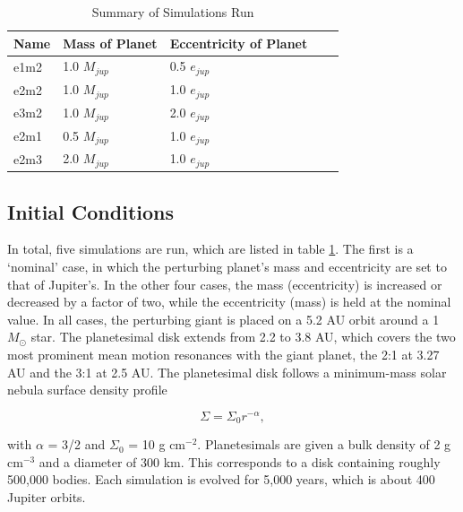 \documentclass[twocolumn]{aastex63}
\begin{document}
\begin{table}
\begin{center}
\caption{Summary of Simulations Run}
\begin{tabular}{lllll} \hline \hline
Name     & Mass of Planet & Eccentricity of Planet &  &  \\ \hline
e1m2 & 1.0 $M_{jup}$                     & 0.5 $e_{jup}$                            &  &  \\
e2m2      & 1.0 $M_{jup}$                     & 1.0 $e_{jup}$                             &  &  \\
e3m2 & 1.0 $M_{jup}$                     & 2.0 $e_{jup}$                             &  &  \\
e2m1 & 0.5 $M_{jup}$                   & 1.0 $e_{jup}$                             &  &  \\
e2m3 & 2.0 $M_{jup}$                     & 1.0 $e_{jup}$                             &  &  \\ \hline
\end{tabular}
\label{tab:sims}
\end{center}
\end{table}

\subsection{Initial Conditions}\label{sec:ics}

In total, five simulations are run, which are listed in table \ref{tab:sims}. The first is a `nominal' case, in which the perturbing planet's mass and 
eccentricity are set to that of Jupiter's. In the other four cases, the mass (eccentricity) is increased or decreased by a factor of two, while the 
eccentricity (mass) is held at the nominal value. In all cases, the perturbing giant is placed on a 5.2 AU orbit around a 1 $M_{\odot}$ star. The 
planetesimal disk extends from 2.2 to 3.8 AU, which covers the two most prominent mean motion resonances with the giant planet, the 2:1 at 3.27 AU 
and the 3:1 at 2.5 AU. The planetesimal disk follows a minimum-mass solar nebula surface density profile \citep{1981PThPS..70...35H}

\begin{equation}\label{eq:surf_den}
	\Sigma = \Sigma_{0} r^{-\alpha},
\end{equation}

\noindent with $\alpha$ = 3/2 and $\Sigma_{0}$ = 10 g cm$^{-2}$. Planetesimals are given a bulk density of 2 g cm$^{-3}$ and a diameter of 
300 km. This corresponds to a disk containing roughly 500,000 bodies. Each simulation is evolved for 5,000 years, which is about 400 Jupiter 
orbits.
\end{document}
